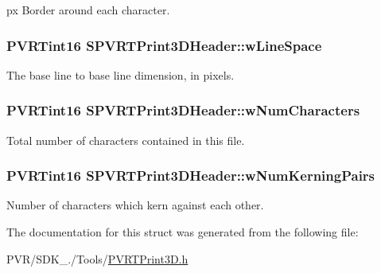 px Border around each character. \hypertarget{struct_s_p_v_r_t_print3_d_header_adcf87f045d50c3672aedb6097fe2b420}{
\subsubsection[{w\+Line\+Space}]{\setlength{\rightskip}{0pt plus 5cm}P\+V\+R\+Tint16 S\+P\+V\+R\+T\+Print3\+D\+Header\+::w\+Line\+Space}}\label{struct_s_p_v_r_t_print3_d_header_adcf87f045d50c3672aedb6097fe2b420}
The base line to base line dimension, in pixels. \hypertarget{struct_s_p_v_r_t_print3_d_header_a8e4123571e66b27d66ed852373e75a11}{
\subsubsection[{w\+Num\+Characters}]{\setlength{\rightskip}{0pt plus 5cm}P\+V\+R\+Tint16 S\+P\+V\+R\+T\+Print3\+D\+Header\+::w\+Num\+Characters}}\label{struct_s_p_v_r_t_print3_d_header_a8e4123571e66b27d66ed852373e75a11}
Total number of characters contained in this file. \hypertarget{struct_s_p_v_r_t_print3_d_header_a4c0f72a85cd20c6d34eb538b0aef216d}{
\subsubsection[{w\+Num\+Kerning\+Pairs}]{\setlength{\rightskip}{0pt plus 5cm}P\+V\+R\+Tint16 S\+P\+V\+R\+T\+Print3\+D\+Header\+::w\+Num\+Kerning\+Pairs}}\label{struct_s_p_v_r_t_print3_d_header_a4c0f72a85cd20c6d34eb538b0aef216d}
Number of characters which kern against each other. 

The documentation for this struct was generated from the following file\+:\begin{DoxyCompactItemize}
\item 
P\+V\+R/\+S\+D\+K\+\_./\+Tools/\hyperlink{_p_v_r_t_print3_d_8h}{P\+V\+R\+T\+Print3\+D.\+h}\end{DoxyCompactItemize}
